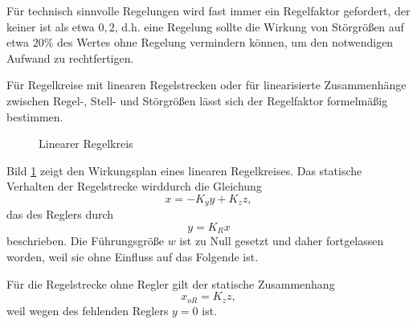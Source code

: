 Für technisch sinnvolle Regelungen wird fast immer ein Regelfaktor gefordert, der keiner ist als etwa \(0,2\), d.h. eine Regelung sollte die Wirkung von Störgrößen auf etwa \(20\%\) des Wertes ohne Regelung vermindern können, um den notwendigen Aufwand zu rechtfertigen.

Für Regelkreise mit linearen Regelstrecken oder für linearisierte Zusammenhänge zwischen Regel-, Stell- und Störgrößen lässt sich der Regelfaktor formelmäßig bestimmen.

\begin{figure}[h]
    \centering
    \caption{Linearer Regelkreis}
    \label{fig:2-10}
\end{figure}

Bild \ref{fig:2-10} zeigt den Wirkungsplan eines linearen Regelkreises.
Das statische Verhalten der Regelstrecke wirddurch die Gleichung
\begin{equation}
    x = -K_y y + K_z z,
\end{equation}
das des Reglers durch
\begin{equation}
    y = K_R x
\end{equation}
beschrieben.
Die Führungsgröße \(w\) ist zu Null gesetzt und daher fortgelassen worden, weil sie ohne Einfluss auf das Folgende ist.

Für die Regelstrecke ohne Regler gilt der statische Zusammenhang
\begin{equation}\label{eq:2-36}
    x_{oR} = K_z z,
\end{equation}
weil wegen des fehlenden Reglers \(y = 0\) ist.

